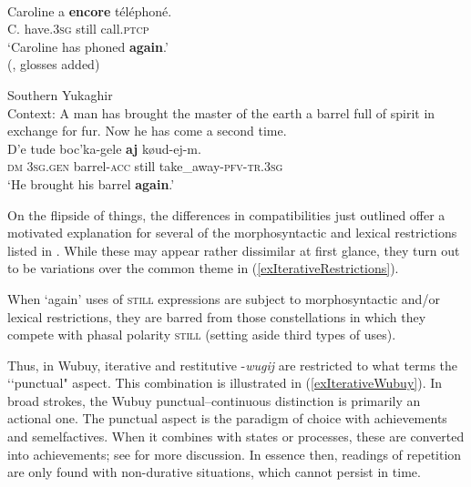 \begin{exe}
	\ex\label{exIterativePFVFrench}
	\\
	\gll Caroline a \textbf{encore} téléphoné.\\
	C. have.3\textsc{sg} still call.\textsc{ptcp}\\
	\glt \lq Caroline has phoned \textbf{again}.\rq
	\\(\cite[148]{MosegaardHansen2008},  glosses added)
	
	\ex\label{exIterativePFVFrenchKolyma}
	 Southern Yukaghir\\
	 Context: A man has brought the master of the earth a barrel full of spirit in exchange for fur. Now he has come a second time.\\
	\gll D’e tude boc’ka-gele \textbf{aj} køud-ej-m.\\
	\textsc{dm} 3\textsc{sg}.\textsc{gen} barrel-\textsc{acc} still take\_away-\textsc{pfv}-\textsc{tr}.3\textsc{sg}\\
	\glt \lq He brought his barrel \textbf{again}.' \parencite[text 25]{NikolaevaMayer2004}
\end{exe}

On the flipside of things, the differences in compatibilities just outlined offer a motivated explanation for several of the morphosyntactic and lexical restrictions listed in . While these may appear rather dissimilar at first glance, they turn out to be variations over the common theme in (\ref{exIterativeRestrictions}).

\begin{exe}

	\ex\label{exIterativeRestrictions}
	When \lq again\rq{ }uses of \textsc{still} expressions are subject to morphosyntactic and/or lexical restrictions, they are barred from those constellations in which they compete with phasal polarity \textsc{still} (setting aside third types of uses).
\end{exe}

Thus, in Wubuy, iterative and restitutive \mbox{-\textit{wugij}} are restricted to what \textcite{Heath1984} terms the \lq\lq punctual" aspect. This combination is illustrated in (\ref{exIterativeWubuy}). In broad strokes, the Wubuy punctual–continuous distinction is primarily an actional one. The punctual aspect is the paradigm of choice with achievements and semelfactives. When it combines with states or processes, these are converted into achievements; see \textcite[337–341]{Heath1984} for more discussion. In essence then, readings of repetition are only found with non-durative situations, which cannot persist in time.

